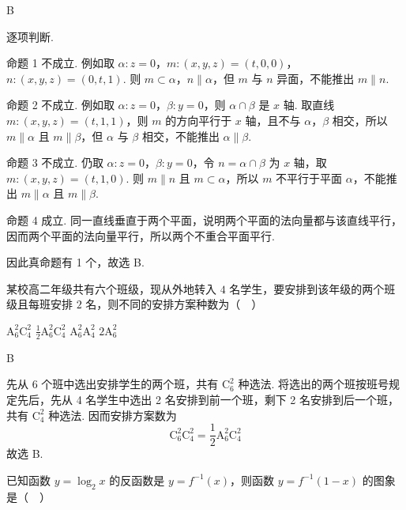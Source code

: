\begin{answer}B\end{answer}

\begin{solution}
逐项判断.

命题 1 不成立. 例如取 \(\alpha:z=0\)，\(m:(x,y,z)=(t,0,0)\)，\(n:(x,y,z)=(0,t,1)\). 则 \(m\subset\alpha\)，\(n\parallel\alpha\)，但 \(m\) 与 \(n\) 异面，不能推出 \(m\parallel n\).

命题 2 不成立. 例如取 \(\alpha:z=0\)，\(\beta:y=0\)，则 \(\alpha\cap\beta\) 是 \(x\) 轴. 取直线 \(m:(x,y,z)=(t,1,1)\)，则 \(m\) 的方向平行于 \(x\) 轴，且不与 \(\alpha\)，\(\beta\) 相交，所以 \(m\parallel\alpha\) 且 \(m\parallel\beta\)，但 \(\alpha\) 与 \(\beta\) 相交，不能推出 \(\alpha\parallel\beta\).

命题 3 不成立. 仍取 \(\alpha:z=0\)，\(\beta:y=0\)，令 \(n=\alpha\cap\beta\) 为 \(x\) 轴，取 \(m:(x,y,z)=(t,1,0)\). 则 \(m\parallel n\) 且 \(m\subset\alpha\)，所以 \(m\) 不平行于平面 \(\alpha\)，不能推出 \(m\parallel\alpha\) 且 \(m\parallel\beta\).

命题 4 成立. 同一直线垂直于两个平面，说明两个平面的法向量都与该直线平行，因而两个平面的法向量平行，所以两个不重合平面平行.

因此真命题有 1 个，故选 B.
\end{solution}

\begin{problem}
某校高二年级共有六个班级，现从外地转入 \(4\) 名学生，要安排到该年级的两个班级且每班安排 \(2\) 名，则不同的安排方案种数为（\(\quad\)）

\choices
    {\(\mathrm A_6^2\mathrm C_4^2\)}
    {\(\frac{1}{2}\mathrm A_6^2\mathrm C_4^2\)}
    {\(\mathrm A_6^2\mathrm A_4^2\)}
    {\(2\mathrm A_6^2\)}
\end{problem}

\begin{answer}B\end{answer}

\begin{solution}
先从 6 个班中选出安排学生的两个班，共有 \(\mathrm C_6^2\) 种选法.  将选出的两个班按班号规定先后，先从 4 名学生中选出 2 名安排到前一个班，剩下 2 名安排到后一个班，共有 \(\mathrm C_4^2\) 种选法.  因而安排方案数为
\[
\mathrm C_6^2\mathrm C_4^2
 =\frac12\mathrm A_6^2\mathrm C_4^2
\]
故选 B.
\end{solution}

\begin{problem}
已知函数 \(y=\log_2 x\) 的反函数是 \(y=f^{-1}(x)\)，则函数 \(y=f^{-1}(1-x)\) 的图象是（\(\quad\)）

    {}
    {}
    {}
\end{problem}

